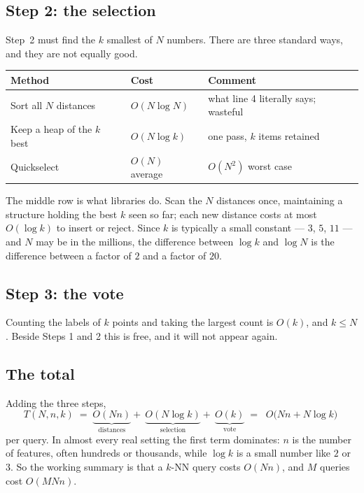 \documentclass[11pt]{article}
\theoremstyle{plain}
\theoremstyle{definition}
\theoremstyle{remark}
\begin{document}
\subsection{Step 2: the selection}
Step~2 must find the $k$ smallest of $N$ numbers. There are three standard ways,
and they are not equally good.

\begin{center}
\renewcommand{\arraystretch}{1.35}
\begin{tabular}{@{}l l l@{}}
\toprule
\textbf{Method} & \textbf{Cost} & \textbf{Comment} \\
\midrule
Sort all $N$ distances & $O(N\log N)$
  & what line 4 literally says; wasteful \\
Keep a heap of the $k$ best & $O(N\log k)$
  & one pass, $k$ items retained \\
Quickselect & $O(N)$ average
  & $O(N^{2})$ worst case \\
\bottomrule
\end{tabular}
\end{center}

\noindent The middle row is what libraries do. Scan the $N$ distances once,
maintaining a structure holding the best $k$ seen so far; each new distance
costs at most $O(\log k)$ to insert or reject. Since $k$ is typically a small
constant --- $3$, $5$, $11$ --- and $N$ may be in the millions, the difference
between $\log k$ and $\log N$ is the difference between a factor of $2$ and a
factor of $20$.

\subsection{Step 3: the vote}
Counting the labels of $k$ points and taking the largest count is $O(k)$, and
$k\le N$. Beside Steps 1 and 2 this is free, and it will not appear again.

\subsection{The total}
Adding the three steps,
\[
  T(N,n,k) \;=\; \underbrace{O(Nn)}_{\text{distances}}
              +\ \underbrace{O(N\log k)}_{\text{selection}}
              +\ \underbrace{O(k)}_{\text{vote}}
  \;=\; \boxed{\;O\bigl(Nn + N\log k\bigr)\;}
\]
per query. In almost every real setting the first term dominates: $n$ is the
number of features, often hundreds or thousands, while $\log k$ is a small
number like $2$ or $3$. So the working summary is that a $k$-NN query costs
$O(Nn)$, and $M$ queries cost $O(MNn)$.
\end{document}
